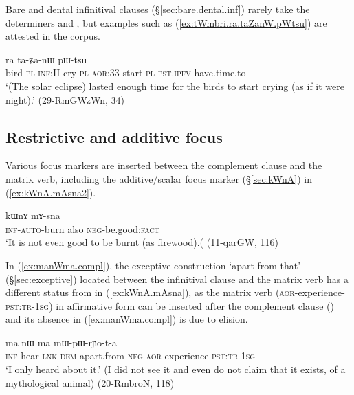 Bare and dental infinitival clauses (§\ref{sec:bare.dental.inf}) rarely take the determiners  and , but examples such as (\ref{ex:tWmbri.ra.taZanW.pWtsu}) are attested in the corpus.

\begin{exe}
\ex \label{ex:tWmbri.ra.taZanW.pWtsu}
 ra ta-ʑa-nɯ pɯ-tsu \\
bird \textsc{pl} \textsc{inf}:II-cry \textsc{pl} \textsc{aor}:3\fl{}3-start-\textsc{pl} \textsc{pst}.\textsc{ipfv}-have.time.to \\
\glt `(The solar eclipse) lasted enough time for the birds to start crying (as if it were night).' (29-RmGWzWn, 34)
\end{exe}
 
 
\subsection{Restrictive and additive focus} \label{sec:complement.restriction}
Various focus markers are inserted between the complement clause and the matrix verb, including the additive/scalar focus marker  (§\ref{sec:kWnA}) in (\ref{ex:kWnA.mAsna2}).

\begin{exe}
\ex \label{ex:kWnA.mAsna2}
\gll [kɤ-nɯ-βlɯ] kɯnɤ mɤ-sna \\
\textsc{inf}-\textsc{auto}-burn also \textsc{neg}-be.good:\textsc{fact} \\
\glt `It is not even good to be burnt (as firewood).( (11-qarGW, 116)
\end{exe}

In (\ref{ex:manWma.compl}),  the exceptive construction  `apart from that' (§\ref{sec:exceptive})  located between the infinitival clause  and the matrix verb has a different status from  in (\ref{ex:kWnA.mAsna}), as the matrix verb  (\textsc{aor}-experience-\textsc{pst}:\textsc{tr}-\textsc{1sg}) in affirmative form can be inserted after the complement clause () and its absence in (\ref{ex:manWma.compl}) is due to elision.

\begin{exe}
\ex \label{ex:manWma.compl}
\gll  [kɤ-mtsʰɤm] ma nɯ ma mɯ-pɯ-rɲo-t-a \\
\textsc{inf}-hear \textsc{lnk} \textsc{dem} apart.from \textsc{neg}-\textsc{aor}-experience-\textsc{pst}:\textsc{tr}-\textsc{1sg} \\
\glt `I only heard about it.' (I did not see it and even do not claim that it exists, of a mythological animal) (20-RmbroN, 118)
\end{exe}

